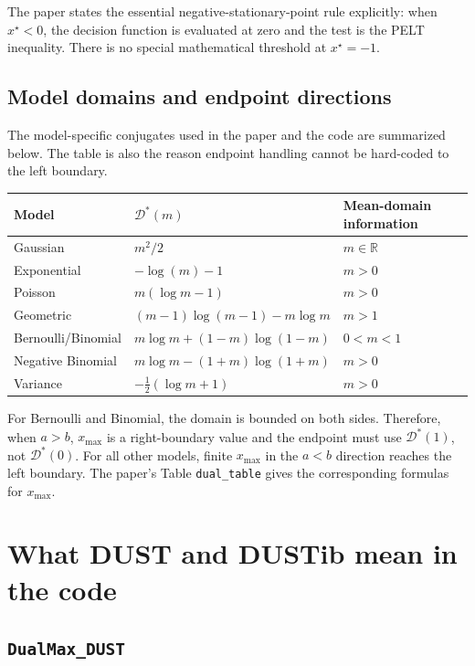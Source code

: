 \documentclass[11pt]{article}
\newcommand{\R}{\mathbb{R}}
\newcommand{\Dstar}{\mathcal{D}^*}
\begin{document}
The paper states the essential negative-stationary-point rule explicitly:
when $x^\star<0$, the decision function is evaluated at zero and the test is
the PELT inequality.  There is no special mathematical threshold at
$x^\star=-1$.

\subsection{Model domains and endpoint directions}

The model-specific conjugates used in the paper and the code are summarized
below.  The table is also the reason endpoint handling cannot be hard-coded
to the left boundary.

\begin{center}
\small
\begin{tabular}{lll}
\toprule
Model & $\Dstar(m)$ & Mean-domain information \\
\midrule
Gaussian & $m^2/2$ & $m\in\R$ \\
Exponential & $-\log(m)-1$ & $m>0$ \\
Poisson & $m(\log m-1)$ & $m>0$ \\
Geometric & $(m-1)\log(m-1)-m\log m$ & $m>1$ \\
Bernoulli/Binomial & $m\log m+(1-m)\log(1-m)$ & $0<m<1$ \\
Negative Binomial & $m\log m-(1+m)\log(1+m)$ & $m>0$ \\
Variance & $-\tfrac12(\log m+1)$ & $m>0$ \\
\bottomrule
\end{tabular}
\end{center}

For Bernoulli and Binomial, the domain is bounded on both sides.  Therefore,
when $a>b$, $x_{\max}$ is a right-boundary value and the endpoint must use
$\Dstar(1)$, not $\Dstar(0)$.  For all other models, finite $x_{\max}$ in
the $a<b$ direction reaches the left boundary.  The paper's Table
\texttt{dual\_table} gives the corresponding formulas for $x_{\max}$.

\section{What DUST and DUSTib mean in the code}

\subsection{\texttt{DualMax\_DUST}}
\end{document}
